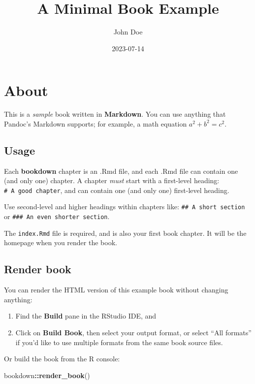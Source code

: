 \documentclass[
]{book}
\title{A Minimal Book Example}
\author{John Doe}
\date{2023-07-14}
\newenvironment{Shaded}{\begin{snugshade}}{\end{snugshade}}
\newcommand{\FunctionTok}[1]{\textcolor[rgb]{0.13,0.29,0.53}{\textbf{#1}}}
\newcommand{\NormalTok}[1]{#1}
\newcommand{\SpecialCharTok}[1]{\textcolor[rgb]{0.81,0.36,0.00}{\textbf{#1}}}
\theoremstyle{definition}
\theoremstyle{definition}
\theoremstyle{definition}
\theoremstyle{definition}
\theoremstyle{remark}
\begin{document}
\maketitle

{
\setcounter{tocdepth}{1}
\tableofcontents
}
\hypertarget{about}{%
\chapter{About}\label{about}}

This is a \emph{sample} book written in \textbf{Markdown}. You can use anything that Pandoc's Markdown supports; for example, a math equation \(a^2 + b^2 = c^2\).

\hypertarget{usage}{%
\section{Usage}\label{usage}}

Each \textbf{bookdown} chapter is an .Rmd file, and each .Rmd file can contain one (and only one) chapter. A chapter \emph{must} start with a first-level heading: \texttt{\#\ A\ good\ chapter}, and can contain one (and only one) first-level heading.

Use second-level and higher headings within chapters like: \texttt{\#\#\ A\ short\ section} or \texttt{\#\#\#\ An\ even\ shorter\ section}.

The \texttt{index.Rmd} file is required, and is also your first book chapter. It will be the homepage when you render the book.

\hypertarget{render-book}{%
\section{Render book}\label{render-book}}

You can render the HTML version of this example book without changing anything:

\begin{enumerate}
\def\labelenumi{\arabic{enumi}.}
\item
  Find the \textbf{Build} pane in the RStudio IDE, and
\item
  Click on \textbf{Build Book}, then select your output format, or select ``All formats'' if you'd like to use multiple formats from the same book source files.
\end{enumerate}

Or build the book from the R console:

\begin{Shaded}
\begin{Highlighting}[]
\NormalTok{bookdown}\SpecialCharTok{::}\FunctionTok{render\_book}\NormalTok{()}
\end{Highlighting}
\end{Shaded}
\end{document}
